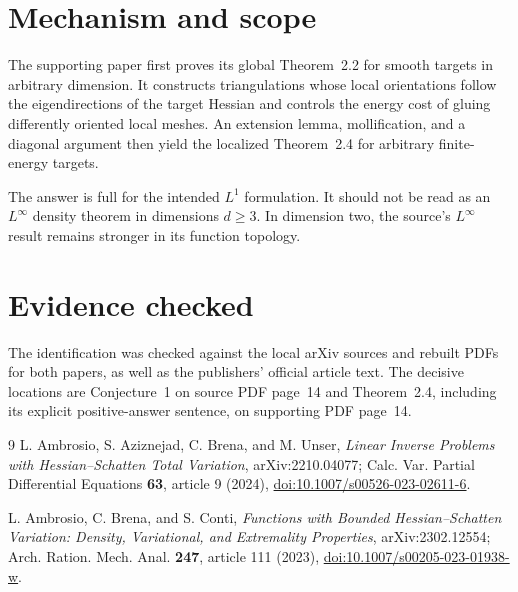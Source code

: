 \documentclass[11pt]{article}
\begin{document}
\section*{Mechanism and scope}
The supporting paper first proves its global Theorem~2.2 for smooth targets in
arbitrary dimension.  It constructs triangulations whose local orientations
follow the eigendirections of the target Hessian and controls the energy cost
of gluing differently oriented local meshes.  An extension lemma,
mollification, and a diagonal argument then yield the localized Theorem~2.4
for arbitrary finite-energy targets.

The answer is full for the intended $L^1$ formulation.  It should not be read
as an $L^\infty$ density theorem in dimensions $d\geq3$.  In dimension two,
the source's $L^\infty$ result remains stronger in its function topology.

\section*{Evidence checked}
The identification was checked against the local arXiv sources and rebuilt
PDFs for both papers, as well as the publishers' official article text.  The
decisive locations are Conjecture~1 on source PDF page~14 and Theorem~2.4,
including its explicit positive-answer sentence, on supporting PDF page~14.

{\raggedright
\begin{thebibliography}{9}
L. Ambrosio, S. Aziznejad, C. Brena, and M. Unser,
\emph{Linear Inverse Problems with Hessian--Schatten Total Variation},
arXiv:2210.04077; Calc. Var. Partial Differential Equations \textbf{63},
article 9 (2024),
\href{https://doi.org/10.1007/s00526-023-02611-6}{doi:10.1007/s00526-023-02611-6}.

L. Ambrosio, C. Brena, and S. Conti,
\emph{Functions with Bounded Hessian--Schatten Variation: Density,
Variational, and Extremality Properties},
arXiv:2302.12554; Arch. Ration. Mech. Anal. \textbf{247}, article 111 (2023),
\href{https://doi.org/10.1007/s00205-023-01938-w}{doi:10.1007/s00205-023-01938-w}.
\end{thebibliography}
\par}
\end{document}

